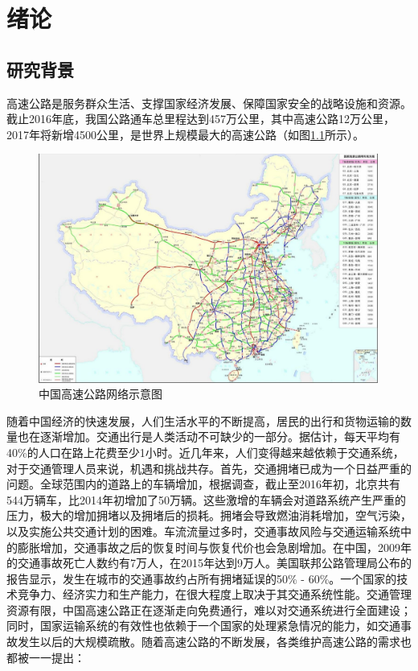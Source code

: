 
\chapter{绪论}
\section{研究背景}

高速公路是服务群众生活、支撑国家经济发展、保障国家安全的战略设施和资源。截止2016年底，我国公路通车总里程达到457万公里，其中高速公路12万公里，2017年将新增4500公里，是世界上规模最大的高速公路（如图\ref{gaosugonglu}所示）。 

				\begin{figure}[h]
				\centering
						\begin{minipage}{0.8\linewidth}
							\centering
							\includegraphics[width=4.4in]{picture/gaosugonglu}
							\caption{中国高速公路网络示意图}
							\label{gaosugonglu}
						\end{minipage}%
				\end{figure}

随着中国经济的快速发展，人们生活水平的不断提高，居民的出行和货物运输的数量也在逐渐增加。交通出行是人类活动不可缺少的一部分。据估计，每天平均有40\%的人口在路上花费至少1小时。近几年来，人们变得越来越依赖于交通系统，对于交通管理人员来说，机遇和挑战共存。首先，交通拥堵已成为一个日益严重的问题。全球范围内的道路上的车辆增加，根据调查，截止至2016年初，北京共有544万辆车，比2014年初增加了50万辆。这些激增的车辆会对道路系统产生严重的压力，极大的增加拥堵以及拥堵后的损耗。拥堵会导致燃油消耗增加，空气污染，以及实施公共交通计划的困难。车流流量过多时，交通事故风险与交通运输系统中的膨胀增加，交通事故之后的恢复时间与恢复代价也会急剧增加。在中国，2009年的交通事故死亡人数约有7万人，在2015年达到9万人。美国联邦公路管理局公布的报告显示，发生在城市的交通事故约占所有拥堵延误的50\% - 60\%。一个国家的技术竞争力、经济实力和生产能力，在很大程度上取决于其交通系统性能。交通管理资源有限，中国高速公路正在逐渐走向免费通行，难以对交通系统进行全面建设；同时，国家运输系统的有效性也依赖于一个国家的处理紧急情况的能力，如交通事故发生以后的大规模疏散。随着高速公路的不断发展，各类维护高速公路的需求也都被一一提出：

